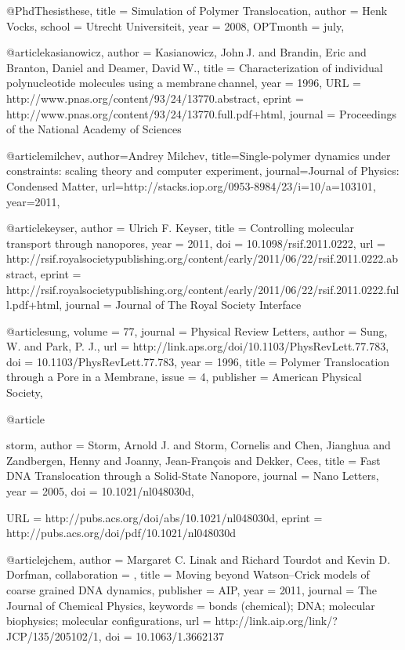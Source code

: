 @PhdThesis{these,
title = {Simulation of Polymer Translocation},
author = {Henk Vocks},
school = {Utrecht Universiteit},
year = {2008},
OPTmonth = {july},
}

@article{kasianowicz,
author = {Kasianowicz, John J. and Brandin, Eric and Branton, Daniel and Deamer, David W.}, 
title = {Characterization of individual polynucleotide molecules using a membrane channel}, 
year = {1996}, 
URL = {http://www.pnas.org/content/93/24/13770.abstract}, 
eprint = {http://www.pnas.org/content/93/24/13770.full.pdf+html}, 
journal = {Proceedings of the National Academy of Sciences} 
}


  	
@article{milchev,
  author={Andrey Milchev},
  title={Single-polymer dynamics under constraints: scaling theory and computer experiment},
  journal={Journal of Physics: Condensed Matter},
    url={http://stacks.iop.org/0953-8984/23/i=10/a=103101},
  year={2011},
}

@article{keyser,
author = {Ulrich F. Keyser}, 
title = {Controlling molecular transport through nanopores}, 
year = {2011}, 
doi = {10.1098/rsif.2011.0222},  
url = {http://rsif.royalsocietypublishing.org/content/early/2011/06/22/rsif.2011.0222.abstract}, 
eprint = {http://rsif.royalsocietypublishing.org/content/early/2011/06/22/rsif.2011.0222.full.pdf+html}, 
journal = {Journal of The Royal Society Interface} 
}


@article{sung,
  volume = {77},
  journal = {Physical Review Letters},
  author = {Sung, W. and Park, P. J.},
  url = {http://link.aps.org/doi/10.1103/PhysRevLett.77.783},
  doi = {10.1103/PhysRevLett.77.783},
  year = {1996},
  title = {Polymer Translocation through a Pore in a Membrane},
  issue = {4},
  publisher = {American Physical Society},
}

@article{storm,
author = {Storm, Arnold J. and Storm, Cornelis and Chen, Jianghua and Zandbergen, Henny and Joanny, Jean-François and Dekker, Cees},
title = {Fast DNA Translocation through a Solid-State Nanopore},
journal = {Nano Letters},
year = {2005},
doi = {10.1021/nl048030d},

URL = {http://pubs.acs.org/doi/abs/10.1021/nl048030d},
eprint = {http://pubs.acs.org/doi/pdf/10.1021/nl048030d}
}

@article{jchem,
author = {Margaret C. Linak and Richard Tourdot and Kevin D. Dorfman},
collaboration = {},
title = {Moving beyond Watson--Crick models of coarse grained DNA dynamics},
publisher = {AIP},
year = {2011},
journal = {The Journal of Chemical Physics},
keywords = {bonds (chemical); DNA; molecular biophysics; molecular configurations},
url = {http://link.aip.org/link/?JCP/135/205102/1},
doi = {10.1063/1.3662137}
}

